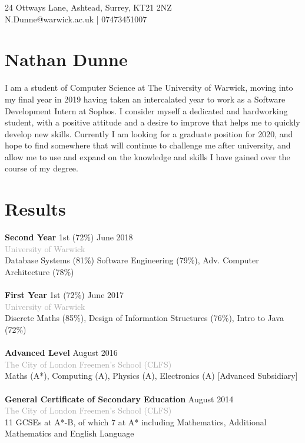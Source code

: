 \documentclass[11pt]{article}
\begin{document}
\hspace*{\fill} 24 Ottways Lane, Ashtead, Surrey, KT21 2NZ \\
\hspace*{\fill} N.Dunne@warwick.ac.uk | 07473451007
\section*{Nathan Dunne}
\vspace{1ex}

I am a student of Computer Science at The University of Warwick, moving into my final year in 2019 having taken an intercalated year to work as a Software Development Intern at Sophos. I consider myself a dedicated and hardworking student, with a positive attitude and a desire to improve that helps me to quickly develop new skills. Currently I am looking for a graduate position for 2020, and hope to find somewhere that will continue to challenge me after university, and allow me to use and expand on the knowledge and skills I have gained over the course of
my degree.
 \section*{Results}
\textbf{Second Year} \hfill 1st (72\%) \hfill June 2018 \\
\textcolor{darkgray}{University of Warwick} \\
\hspace{5em} Database Systems (81\%) Software Engineering (79\%), Adv. Computer Architecture (78\%)
\\\\
\textbf{First Year} \hfill \hspace{1em} 1st (72\%) \hfill June 2017 \\    
\textcolor{darkgray}{University of Warwick} \\
\hspace{2em} Discrete Maths (85\%), Design of Information Structures (76\%), Intro to Java (72\%)
\\\\
\textbf{Advanced Level} \hfill August 2016 \\
\textcolor{darkgray}{The City of London Freemen’s School (CLFS)} \\                    
\hspace{2em} Maths (A*), Computing (A), Physics (A), Electronics (A) [Advanced Subsidiary]
\\\\
\textbf{General Certificate of Secondary Education} \hfill August 2014 \\
\textcolor{darkgray}{The City of London Freemen’s School (CLFS)} \\  
\hspace{2em} 11 GCSEs at A*-B, of which 7 at A* including Mathematics, Additional Mathematics and English Language
 
\end{document}
